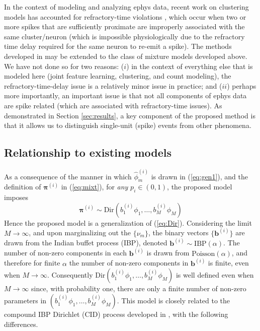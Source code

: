 \documentclass[journal]{IEEEtran}
\newcommand{\beq}{\begin{equation}}
\newcommand{\eeq}{\end{equation}}
\newcommand{\bv}{\boldsymbol{b}}
\newcommand{\piv}{\boldsymbol{\pi}}
\begin{document}
In the context of modeling and analyzing ephys data, recent work on clustering models has accounted for refractory-time
violations \cite{Wood2009,Bo2011}, which occur when two or more spikes that
are sufficiently proximate are improperly associated with the same
cluster/neuron (which is impossible physiologically due to the refractory time delay
required for the same neuron to re-emit a spike). The methods developed in \cite{Wood2009,Bo2011} may be extended to the class of mixture models developed above. We have not done so for two reasons: ($i$) in the context of everything else that is modeled here (joint feature learning, clustering, and count modeling), the refractory-time-delay issue is a relatively minor issue in practice; and ($ii$) perhaps more importantly, an important issue is that not all components of ephys data are spike related (which are associated with refractory-time issues). As demonstrated in Section \ref{sec:results}, a key component of the proposed method is that it allows us to distinguish single-unit (spike) events from other phenomena.

\subsection{Relationship to existing models\label{sec:related}}

As a consequence of the manner in which $\hat{\phi}_m^{(i)}$ is drawn in (\ref{eq:gen1}), and the definition of $\piv^{(i)}$ in (\ref{eq:mixt}), for \emph{any} $p_i\in(0,1)$, the proposed model imposes
\beq \piv^{(i)}\sim\mbox{Dir}(b_1^{(i)}{\phi}_1,\dots,b_M^{(i)}{\phi}_M)\eeq
Hence the proposed model is a generalization of (\ref{eq:Dir}). Considering the limit $M\rightarrow\infty$, and upon marginalizing out the $\{\nu_m\}$, the binary vectors $\{\bv^{(i)}\}$ are drawn from the Indian buffet process (IBP), denoted $\bv^{(i)}\sim\mbox{IBP}(\alpha)$. The number of non-zero components in each $\bv^{(i)}$ is drawn from $\mbox{Poisson}(\alpha)$, and therefore for finite $\alpha$ the number of non-zero components in $\bv^{(i)}$ is finite, even when $M\rightarrow\infty$. Consequently $\mbox{Dir}(b_1^{(i)}{\phi}_1,\dots,b_M^{(i)}{\phi}_M)$ is well defined even when $M\rightarrow\infty$ since, with probability one, there are only a finite number of non-zero parameters in $(b_1^{(i)}{\phi}_1,\dots,b_M^{(i)}{\phi}_M)$. This model is closely related to the compound IBP Dirichlet (CID) process developed in \cite{compound}, with the following differences.
\end{document}
